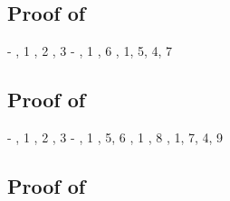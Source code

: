\subsection*{Proof of }

\begin{derivation}
     {\hyp}
     {\Renega, 1}
     {\Rcxaxmono, 2}
     {\Retrue, 3}
     {\hyp}
\step{\cxwfO}
     {, 1}
\step{\istyO{\bool}}
     {\Rtbool, 6}
     {\Reif, 1, 5, 4, 7}
\end{derivation}



\subsection*{Proof of }

\begin{derivation}
     {\hyp}
     {\Renega, 1}
     {\Rcxaxmono, 2}
     {\Retrue, 3}
     {\hyp}
     {\Rcxaxmono, 1}
     {, 5, 6}
\step{\cxwfO}
     {, 1}
\step{\istyO{\bool}}
     {\Rtbool, 8}
     {\Reif, 1, 7, 4, 9}
\end{derivation}



\subsection*{Proof of }

